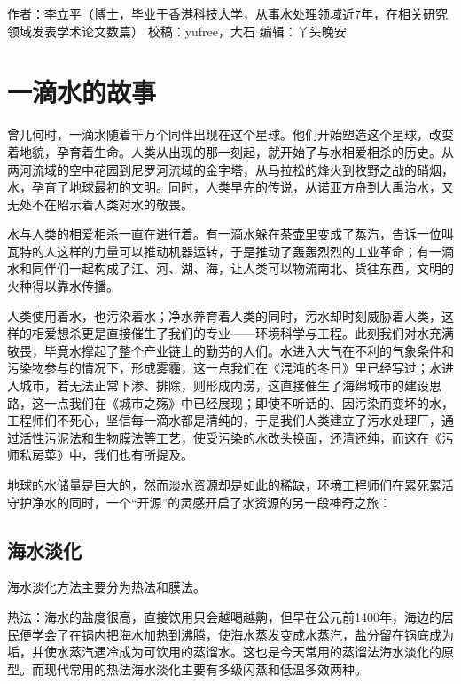\documentclass[
]{book}
\begin{document}
作者：李立平（博士，毕业于香港科技大学，从事水处理领域近7年，在相关研究领域发表学术论文数篇）
校稿：yufree，大石
编辑：丫头晚安

\hypertarget{ux4e00ux6ef4ux6c34ux7684ux6545ux4e8b}{%
\section{一滴水的故事}\label{ux4e00ux6ef4ux6c34ux7684ux6545ux4e8b}}

曾几何时，一滴水随着千万个同伴出现在这个星球。他们开始塑造这个星球，改变着地貌，孕育着生命。人类从出现的那一刻起，就开始了与水相爱相杀的历史。从两河流域的空中花园到尼罗河流域的金字塔，从马拉松的烽火到牧野之战的硝烟，水，孕育了地球最初的文明。同时，人类早先的传说，从诺亚方舟到大禹治水，又无处不在昭示着人类对水的敬畏。

水与人类的相爱相杀一直在进行着。有一滴水躲在茶壶里变成了蒸汽，告诉一位叫瓦特的人这样的力量可以推动机器运转，于是推动了轰轰烈烈的工业革命；有一滴水和同伴们一起构成了江、河、湖、海，让人类可以物流南北、货往东西，文明的火种得以靠水传播。

人类使用着水，也污染着水；净水养育着人类的同时，污水却时刻威胁着人类，这样的相爱想杀更是直接催生了我们的专业------环境科学与工程。此刻我们对水充满敬畏，毕竟水撑起了整个产业链上的勤劳的人们。水进入大气在不利的气象条件和污染物参与的情况下，形成雾霾，这一点我们在《混沌的冬日》里已经写过；水进入城市，若无法正常下渗、排除，则形成内涝，这直接催生了海绵城市的建设思路，这一点我们在《城市之殇》中已经展现；即使不听话的、因污染而变坏的水，工程师们不死心，坚信每一滴水都是清纯的，于是我们人类建立了污水处理厂，通过活性污泥法和生物膜法等工艺，使受污染的水改头换面，还清还纯，而这在《污师私房菜》中，我们也有所提及。

地球的水储量是巨大的，然而淡水资源却是如此的稀缺，环境工程师们在累死累活守护净水的同时，一个``开源''的灵感开启了水资源的另一段神奇之旅：

\hypertarget{ux6d77ux6c34ux6de1ux5316}{%
\subsection{海水淡化}\label{ux6d77ux6c34ux6de1ux5316}}

海水淡化方法主要分为热法和膜法。

热法：海水的盐度很高，直接饮用只会越喝越齁，但早在公元前1400年，海边的居民便学会了在锅内把海水加热到沸腾，使海水蒸发变成水蒸汽，盐分留在锅底成为垢，并使水蒸汽遇冷成为可饮用的蒸馏水。这也是今天常用的蒸馏法海水淡化的原型。而现代常用的热法海水淡化主要有多级闪蒸和低温多效两种。
\end{document}
